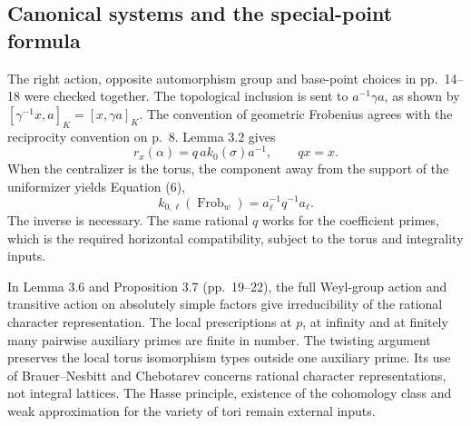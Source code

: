 \documentclass[10pt]{article}
\begin{document}
\subsection*{Canonical systems and the special-point formula}
The right action, opposite automorphism group and base-point choices in pp. 14–18 were checked together. The topological inclusion is sent to \(a^{-1}\gamma a\), as shown by \([\gamma^{-1}x,a]_K=[x,\gamma a]_K\). The convention of geometric Frobenius agrees with the reciprocity convention on p. 8. Lemma 3.2 gives \[r_x(\alpha)=q\,a k_0(\sigma)a^{-1},\qquad qx=x.\] When the centralizer is the torus, the component away from the support of the uniformizer yields Equation (6), \[k_{0,\ell}(\operatorname{Frob}_w)=a_\ell^{-1}q^{-1}a_\ell.\] The inverse is necessary. The same rational \(q\) works for the coefficient primes, which is the required horizontal compatibility, subject to the torus and integrality inputs.\par
In Lemma 3.6 and Proposition 3.7 (pp. 19–22), the full Weyl-group action and transitive action on absolutely simple factors give irreducibility of the rational character representation. The local prescriptions at \(p\), at infinity and at finitely many pairwise auxiliary primes are finite in number. The twisting argument preserves the local torus isomorphism types outside one auxiliary prime. Its use of Brauer–Nesbitt and Chebotarev concerns rational character representations, not integral lattices. The Hasse principle, existence of the cohomology class and weak approximation for the variety of tori remain external inputs.\par
\end{document}
